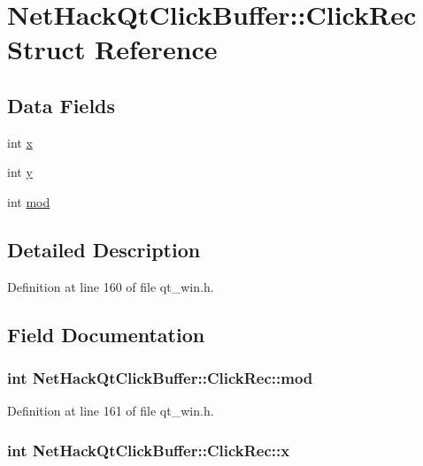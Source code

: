 \hypertarget{structNetHackQtClickBuffer_1_1ClickRec}{\section{Net\+Hack\+Qt\+Click\+Buffer\+:\+:Click\+Rec Struct Reference}
\label{structNetHackQtClickBuffer_1_1ClickRec}
}
\subsection*{Data Fields}
\begin{DoxyCompactItemize}
\item 
int \hyperlink{structNetHackQtClickBuffer_1_1ClickRec_a2efe0cbe1266ab4f698f605c3ccbf54c}{x}
\item 
int \hyperlink{structNetHackQtClickBuffer_1_1ClickRec_a6642d62ffcdeef81209dc24ccea3ea54}{y}
\item 
int \hyperlink{structNetHackQtClickBuffer_1_1ClickRec_a013a2bd5ff8124d3d42c56be01ad3ce7}{mod}
\end{DoxyCompactItemize}


\subsection{Detailed Description}


Definition at line 160 of file qt\+\_\+win.\+h.



\subsection{Field Documentation}
\hypertarget{structNetHackQtClickBuffer_1_1ClickRec_a013a2bd5ff8124d3d42c56be01ad3ce7}{
\subsubsection[{mod}]{\setlength{\rightskip}{0pt plus 5cm}int Net\+Hack\+Qt\+Click\+Buffer\+::\+Click\+Rec\+::mod}}\label{structNetHackQtClickBuffer_1_1ClickRec_a013a2bd5ff8124d3d42c56be01ad3ce7}


Definition at line 161 of file qt\+\_\+win.\+h.

\hypertarget{structNetHackQtClickBuffer_1_1ClickRec_a2efe0cbe1266ab4f698f605c3ccbf54c}{
\subsubsection[{x}]{\setlength{\rightskip}{0pt plus 5cm}int Net\+Hack\+Qt\+Click\+Buffer\+::\+Click\+Rec\+::x}}\label{structNetHackQtClickBuffer_1_1ClickRec_a2efe0cbe1266ab4f698f605c3ccbf54c}



